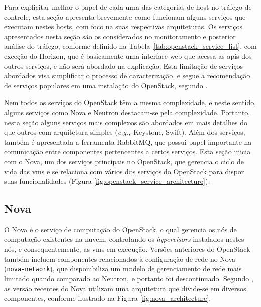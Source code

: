 \vspace{-0.5cm}
Para explicitar melhor o papel de cada uma das categorias de host no tráfego de controle, esta seção apresenta brevemente como funcionam alguns serviços que executam nestes hosts, com foco na suas respectivas arquiteturas.
%
Os serviços apresentados nesta seção são os considerados no monitoramento e posterior análise do tráfego, conforme definido na Tabela~\ref{tab:openstack_service_list}, com exceção do Horizon, que é basicamente uma interface web que acessa as \acp{api} dos outros serviços, e não será abordado na explicação.
%
Esta limitação de serviços abordados visa simplificar o processo de caracterização, e segue a recomendação de serviços populares em uma instalação do OpenStack, segundo \cite{openstack:about}.



Nem todos os serviços do OpenStack têm a mesma complexidade, e neste sentido, alguns serviços como Nova e Neutron destacam-se pela complexidade.
%
Portanto, nesta seção alguns serviços mais complexos são abordados em mais detalhes do que outros com arquitetura simples (\textit{e.g.,} Keystone, Swift).
%
Além dos serviços, também é apresentada a ferramenta RabbitMQ, que possui papel importante na comunicação entre componentes pertencentes a certos serviços.
%
Esta seção inicia com o Nova, um dos serviços principais no OpenStack, que gerencia o ciclo de vida das \acp{vm} e se relaciona com vários dos serviços do OpenStack para dispor suas funcionalidades (Figura \ref{fig:openstack_service_architecture}).

\subsection{Nova}

O Nova é o serviço de computação do OpenStack, o qual gerencia os nós de computação existentes na nuvem, controlando os \textit{hypervisors} instalados nestes nós, e consequentemente, as \acp{vm} em execução. 
%
Versões anteriores do OpenStack também incluem componentes relacionados à configuração de rede no Nova (\texttt{nova-network}), que disponibiliza um modelo de gerenciamento de rede mais limitado quando comparado ao Neutron, e portanto foi descontinuado.
%
Segundo , as versão recentes do Nova utilizam uma arquitetura que divide-se em diversos componentes, conforme ilustrado na Figura \ref{fig:nova_architecture}.

